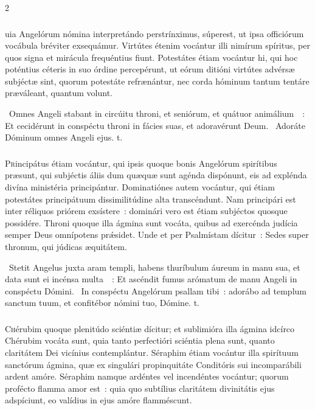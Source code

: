 \documentclass[9pt,twoside]{extarticle}
\begin{document}
\begin{multicols}{2}
{{\subsubsection*{\center {}}
uia Angelórum nómina interpretándo perstrínximus, súperest, ut ipsa officiórum vocábula bréviter exsequámur. Virtútes étenim vocántur illi nimírum spíritus, per quos signa et mirácula frequéntius fiunt. Potestátes étiam vocántur hi, qui hoc poténtius céteris in suo órdine percepérunt, ut eórum ditióni virtútes advérsæ subjéctæ sint, quorum potestáte refrænántur, nec corda hóminum tantum tentáre præváleant, quantum volunt.

\begin{tightlist}{}
\item {}~Omnes Angeli stabant in circúitu throni, et seniórum, et quátuor animálium~~: \textred{*} Et cecidérunt in conspéctu throni in fácies suas, et adoravérunt Deum. ~Adoráte Dóminum omnes Angeli ejus. t.
\end{tightlist}

\subsubsection*{\center {}}
\lettrine{P}rincipátus étiam vocántur, qui ipsis quoque bonis Angelórum spirítibus præsunt, qui subjéctis áliis dum quæquæ sunt agénda dispónunt, eis ad explénda divína ministéria principántur. Dominatiónes autem vocántur, qui étiam potestátes principátuum dissimilitúdine alta transcéndunt. Nam principári est inter réliquos priórem exsístere~: dominári vero est étiam subjéctos quosque possidére. Throni quoque illa ágmina sunt vocáta, quibus ad exercénda judícia semper Deus omnípotens prǽsidet. Unde et per Psalmístam dícitur~: Sedes super thronum, qui júdicas æquitátem.

\begin{tightlist}{}
\item {}~Stetit Angelus juxta aram templi, habens thuríbulum áureum in manu sua, et data sunt ei incénsa multa~~: \textred{*} Et ascéndit fumus arómatum de manu Angeli in conspéctu Dómini. ~In conspéctu Angelórum psallam tibi~: adorábo ad templum sanctum tuum, et confitébor nómini tuo, Dómine. t.
\end{tightlist}

\subsubsection*{\center {}}
\lettrine{C}hérubim quoque plenitúdo sciéntiæ dícitur; et sublimióra illa ágmina idcírco Chérubim vocáta sunt, quia tanto perfectióri sciéntia plena sunt, quanto claritátem Dei vicínius contemplántur. Séraphim étiam vocántur illa spirítuum sanctórum ágmina, quæ ex singulári propinquitáte Conditóris sui incomparábili ardent amóre. Séraphim namque ardéntes vel incendéntes vocántur; quorum profécto flamma amor est~: quia quo subtílius claritátem divinitátis ejus adspíciunt, eo valídius in ejus amóre flamméscunt.

}}
\end{multicols}
\end{document}

